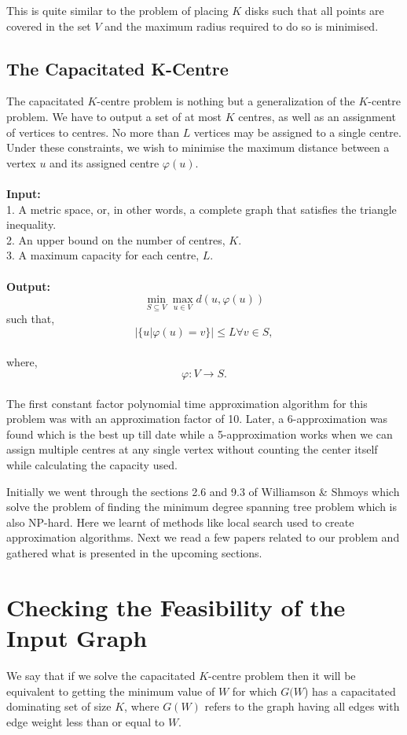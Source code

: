 \documentclass[12pt,a4paper,onecolumn]{article}
\begin{document}
This is quite similar to the problem of placing $K$ disks such that all points are covered in the set $V$ and the maximum radius required to do so is minimised.

\subsection{The Capacitated K-Centre}
The capacitated $K$-centre problem is nothing but a generalization of the $K$-centre problem. We have to
output a set of at most $K$ centres, as well as an assignment of vertices to centres. No more than $L$ vertices may be assigned to a single centre. Under these constraints, we
wish to minimise the maximum distance between a vertex $u$ and its assigned centre
$\varphi (u)$. \\\\
\textbf{Input:}\\1. A metric space, or, in other words, a complete graph that satisfies the triangle inequality.\\2. An
upper bound on the number of centres, $K$.\\3. A maximum capacity for each centre, $L$.\\\\
\textbf{Output:}\\
$$ \min_{S \subseteq V}\max_{u \in V}d(u,\varphi(u)) $$such that,   $$|\{u|\varphi(u) = v\}|\leq L \forall v \in S,$$\\where,   $$\varphi : V \rightarrow S.$$\\
The first constant factor polynomial time approximation
algorithm for this problem was with an approximation factor of 10. Later, a 6-approximation was found which is the best up till date while a 5-approximation works when we can assign multiple centres at any single vertex without counting the center itself while calculating the capacity used.

Initially we went through the sections 2.6 and 9.3 of Williamson \& Shmoys which solve the problem of finding the minimum degree spanning tree problem which is also NP-hard. Here we learnt of methods like local search used to create approximation algorithms. Next we read a few papers related to our problem and gathered what is presented in the upcoming sections.
\section{Checking the Feasibility of the Input Graph}
We say that if we solve the capacitated $K$-centre problem then it will be equivalent to getting the minimum value of $W$ for which $G(W$) has a capacitated dominating set of size $K$, where $G(W)$ refers to the graph having all edges with edge weight less than or equal to $W$.
\end{document}
